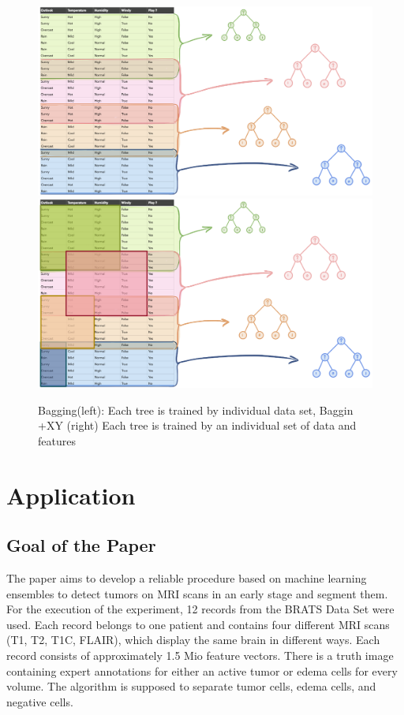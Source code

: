 \documentclass[
12pt,
headsepline,
bibliography=totoc,
twoside=semi,
fleqn
]{scrartcl}
\begin{document}
 \begin{figure}[H]
 \includegraphics[scale=0.4]{BDT12.png}\label{fig:fig12}
 \includegraphics[scale=0.4]{BDT13.png}\label{fig:fig13}
 \caption{Bagging(left): Each tree is trained by individual data set, Baggin +XY (right) Each tree is trained by an individual set of data and features}
 
 \end{figure}

\newpage

\section{Application\label{sec:sec3}}

 \subsection{Goal of the Paper\label{sec:sec3-1}}
 The paper aims to develop a reliable procedure based on machine learning ensembles to detect tumors on MRI scans in an early stage and segment them. For the execution of the experiment, 12 records from the BRATS Data Set were used. Each record belongs to one patient and contains four different MRI scans (T1, T2, T1C, FLAIR), which display the same brain in different ways. Each record consists of approximately 1.5 Mio feature vectors. There is a truth image containing expert annotations for either an active tumor or edema cells for every volume. The algorithm is supposed to separate tumor cells, edema cells, and negative cells.
\end{document}
